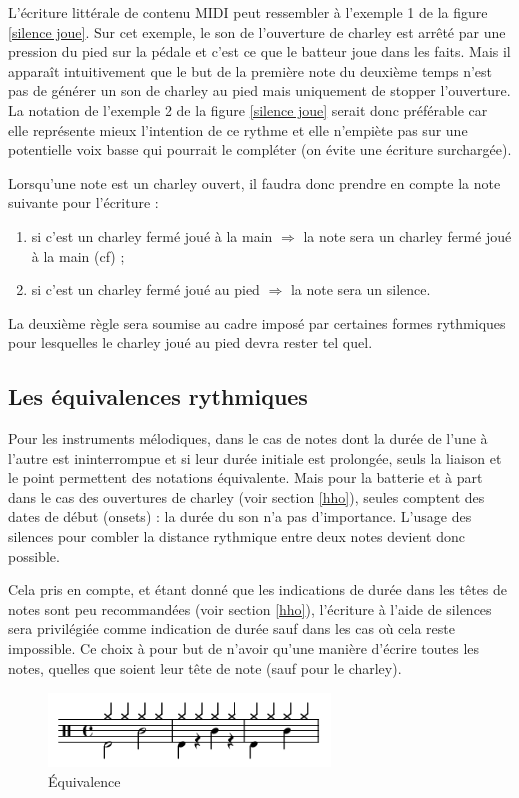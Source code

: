 L’écriture littérale de contenu MIDI peut ressembler à l’exemple 1 de la figure
\ref{silence joue}. Sur cet exemple, le son de l’ouverture de charley est
arrêté par une pression du pied sur la pédale et c’est ce que le batteur joue
dans les faits. Mais il apparaît intuitivement que le but de la première note
du deuxième temps n’est pas de générer un son de charley au pied mais
uniquement de stopper l’ouverture. La notation de l’exemple 2 de la figure
\ref{silence joue} serait donc préférable car elle représente mieux l’intention
de ce rythme et elle n’empiète pas sur une potentielle voix basse qui pourrait
le compléter (on évite une écriture surchargée).

Lorsqu’une note est un charley ouvert, il faudra donc prendre en compte la note
suivante pour l’écriture :
\begin{enumerate}
    \item si c’est un charley fermé joué à la main $\Rightarrow$ la note sera
        un charley fermé joué à la main (cf) ;
    \item si c’est un charley fermé joué au pied $\Rightarrow$ la note sera un
        silence.
\end{enumerate}
La deuxième règle sera soumise au cadre imposé par certaines formes rythmiques
pour lesquelles le charley joué au pied devra rester tel quel. 

\subsection*{Les équivalences rythmiques}
Pour les instruments mélodiques, dans le cas de notes dont la durée de l’une à
l’autre est ininterrompue et si leur durée initiale est prolongée, seuls la
liaison et le point permettent des notations équivalente. Mais pour la
batterie et à part dans le cas des ouvertures de charley (voir section
\ref{hho}), seules comptent des dates de début (onsets) : la durée du son n’a
pas d’importance. L’usage des silences pour combler la distance rythmique entre
deux notes devient donc possible.

Cela pris en compte, et étant donné que les indications de durée dans les têtes
de notes sont peu recommandées (voir section \ref{hho}), l’écriture à l’aide de
silences sera privilégiée comme indication de durée sauf dans les cas où cela
reste impossible. Ce choix à pour but de n’avoir qu’une manière d’écrire toutes
les notes, quelles que soient leur tête de note (sauf pour le charley).

\begin{figure}[h]
	\centering
	\includegraphics[height=20mm, width=75mm]{
    z_images/3_methodes/0_notation_de_la_batterie/6_equivalence.png}
	\caption{Équivalence}
	\label{equivalence}
\end{figure}


